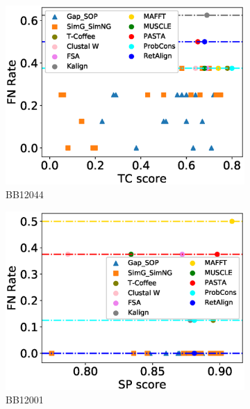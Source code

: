 \begin{figure}[!htbp]
\begin{adjustwidth}{-1.5cm}{-1cm}
\begin{subfigure}{0.22\textwidth}
			\includegraphics[width=\columnwidth]{Figure/summary/precomputedInit/Balibase/BB12044_fnrate_vs_tc_2}
			\caption{BB12044}
		\end{subfigure}
		\begin{subfigure}{0.22\textwidth}
			\includegraphics[width=\columnwidth]{Figure/summary/precomputedInit/Balibase/BB12001_fnrate_vs_sp_2}
			\caption{BB12001}
		\end{subfigure}	
		\begin{subfigure}{0.22\textwidth}

\end{subfigure}
\end{adjustwidth}
\end{figure}
